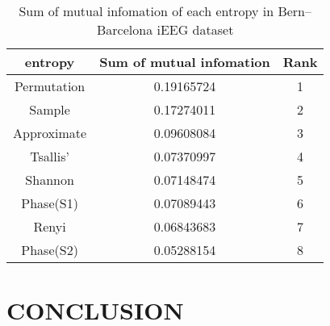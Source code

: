\documentclass[letterpaper, 10 pt, conference]{ieeeconf}  %
\begin{document}
\begin{table}[t]
	\begin{center}
		\caption[Sum of mutual infomation of each entropy in Bern–Barcelona iEEG dataset ]{Sum of mutual infomation of each entropy in Bern–Barcelona iEEG dataset}
		\label{tab:bern_entropy_mutual_info_sum}
		\begin{tabular}{|c|c|c|}
			\hline
			entropy & Sum of mutual infomation & Rank \\ \hline
			Permutation	&	0.19165724	&	1	\\
			Sample	&	0.17274011	&	2	\\
			Approximate	&	0.09608084	&	3	\\
			Tsallis'	&	0.07370997	&	4	\\
			Shannon	&	0.07148474	&	5	\\
			Phase(S1)	&	0.07089443	&	6	\\
			Renyi	&	0.06843683	&	7	\\
			Phase(S2)	&	0.05288154	&	8	\\
			\hline
		\end{tabular}
	\end{center}
\end{table}



\section{CONCLUSION}
\label{sec:conclusion}







\end{document}
